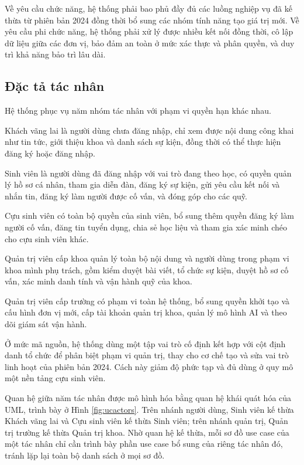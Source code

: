 \documentclass[12pt,a4paper,oneside]{report}
\begin{document}
Về yêu cầu chức năng, hệ thống phải bao phủ đầy đủ các luồng nghiệp vụ đã kế thừa từ phiên bản 2024 đồng thời bổ sung các nhóm tính năng tạo giá trị mới. Về yêu cầu phi chức năng, hệ thống phải xử lý được nhiều kết nối đồng thời, cô lập dữ liệu giữa các đơn vị, bảo đảm an toàn ở mức xác thực và phân quyền, và duy trì khả năng bảo trì lâu dài.

\subsection{Đặc tả tác nhân}

Hệ thống phục vụ năm nhóm tác nhân với phạm vi quyền hạn khác nhau.

Khách vãng lai là người dùng chưa đăng nhập, chỉ xem được nội dung công khai như tin tức, giới thiệu khoa và danh sách sự kiện, đồng thời có thể thực hiện đăng ký hoặc đăng nhập.

Sinh viên là người dùng đã đăng nhập với vai trò đang theo học, có quyền quản lý hồ sơ cá nhân, tham gia diễn đàn, đăng ký sự kiện, gửi yêu cầu kết nối và nhắn tin, đăng ký làm người được cố vấn, và đóng góp cho các quỹ.

Cựu sinh viên có toàn bộ quyền của sinh viên, bổ sung thêm quyền đăng ký làm người cố vấn, đăng tin tuyển dụng, chia sẻ học liệu và tham gia xác minh chéo cho cựu sinh viên khác.

Quản trị viên cấp khoa quản lý toàn bộ nội dung và người dùng trong phạm vi khoa mình phụ trách, gồm kiểm duyệt bài viết, tổ chức sự kiện, duyệt hồ sơ cố vấn, xác minh danh tính và vận hành quỹ của khoa.

Quản trị viên cấp trường có phạm vi toàn hệ thống, bổ sung quyền khởi tạo và cấu hình đơn vị mới, cấp tài khoản quản trị khoa, quản lý mô hình AI và theo dõi giám sát vận hành.

Ở mức mã nguồn, hệ thống dùng một tập vai trò cố định kết hợp với cột định danh tổ chức để phân biệt phạm vi quản trị, thay cho cơ chế tạo và sửa vai trò linh hoạt của phiên bản 2024. Cách này giảm độ phức tạp và đủ dùng ở quy mô một nền tảng cựu sinh viên.

Quan hệ giữa năm tác nhân được mô hình hóa bằng quan hệ khái quát hóa của UML, trình bày ở Hình \ref{fig:ucactors}. Trên nhánh người dùng, Sinh viên kế thừa Khách vãng lai và Cựu sinh viên kế thừa Sinh viên; trên nhánh quản trị, Quản trị trường kế thừa Quản trị khoa. Nhờ quan hệ kế thừa, mỗi sơ đồ use case của một tác nhân chỉ cần trình bày phần use case bổ sung của riêng tác nhân đó, tránh lặp lại toàn bộ danh sách ở mọi sơ đồ.
\end{document}

